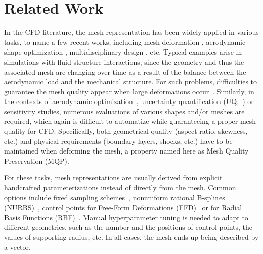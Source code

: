 \section{Related Work}
\label{ch3:sec:related_work}

In the CFD literature, the mesh representation has been widely applied in various tasks, to name a few recent works, including mesh deformation \cite{aa.Mi2022,aa.Stannard2022}, aerodynamic shape optimization \cite{aa.Li2022c,aa.Kaya2022}, multidisciplinary design \cite{aa.Wu2022,aa.Li2022,aa.Li2022}, etc. Typical examples arise in simulations with fluid-structure interactions, since the geometry and thus the associated mesh are changing over time as a result of the balance between the aerodynamic load and the mechanical structure. For such problems, difficulties to guarantee the mesh quality appear when large deformations occur~\cite{aa.Tian2014}. Similarly, in the contexts of aerodynamic optimization~\cite{aa.Lyu2015}, uncertainty quantification (UQ,~\cite{aa.Roy2018}) or sensitivity studies, numerous evaluations of various shapes and/or meshes are required, which again is difficult to automatize while guaranteeing a proper mesh quality for CFD. Specifically, both geometrical quality (aspect ratio, skewness, etc.) and physical requirements (boundary layers, shocks, etc.) have to be maintained when deforming the mesh, a property named here as Mesh Quality Preservation (MQP).

For these tasks, mesh representations are usually derived from explicit handcrafted parameterizations instead of directly from the mesh. Common options include fixed sampling schemes~\cite{aa.Poole2015}, nonuniform rational B-splines (NURBS)~\cite{aa.Toal2010}, control points for Free-Form Deformations (FFD)~\cite{aa.Sederberg1986, aa.Lamousin1994, aa.Kenway2010} or for Radial Basis Functions (RBF)~\cite{aa.deBoer2007}. Manual hyperparameter tuning is needed to adapt to different geometries, such as the number and the positions of control points, the values of supporting radius, etc. In all cases, the mesh ends up being described by a vector.

